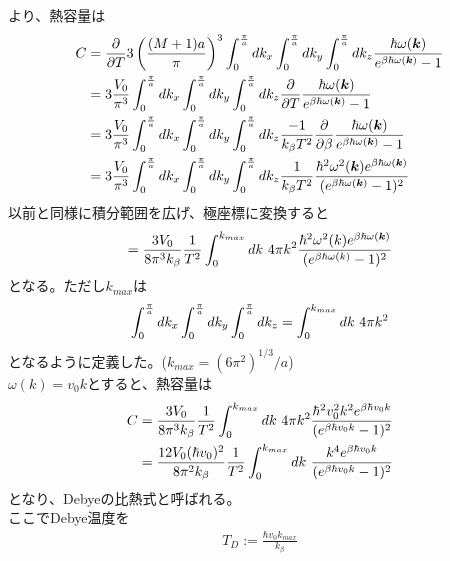 \documentclass[dvipdfmx, 11pt, a4paper]{jsarticle}
\theoremstyle{definition}
\begin{document}
    より、熱容量は
    \begin{align}
        C &= \frac{\partial}{\partial T} 3\left( \frac{(M+1)a}{\pi} \right)^3 \int_0^{\frac{\pi}{a}} dk_x \int_0^{\frac{\pi}{a}} dk_y \int_0^{\frac{\pi}{a}} dk_z \frac{\hbar \omega (\bm{k})}{ e^{\beta \hbar \omega (\bm{k})} - 1} \notag \\
        &= 3\frac{V_0}{\pi^3} \int_0^{\frac{\pi}{a}} dk_x \int_0^{\frac{\pi}{a}} dk_y \int_0^{\frac{\pi}{a}} dk_z  \frac{\partial}{\partial T} \frac{\hbar \omega (\bm{k})}{ e^{\beta \hbar \omega (\bm{k})} - 1} \notag \\
        &= 3\frac{V_0}{\pi^3} \int_0^{\frac{\pi}{a}} dk_x \int_0^{\frac{\pi}{a}} dk_y \int_0^{\frac{\pi}{a}} dk_z \frac{-1}{k_\beta T^2} \frac{\partial}{\partial \beta} \frac{\hbar \omega (\bm{k})}{ e^{\beta \hbar \omega (\bm{k})} - 1} \notag \\
        &= 3\frac{V_0}{\pi^3} \int_0^{\frac{\pi}{a}} dk_x \int_0^{\frac{\pi}{a}} dk_y \int_0^{\frac{\pi}{a}} dk_z \frac{1}{k_\beta T^2} \frac{\hbar^2 \omega^2 (\bm{k}) e^{\beta \hbar \omega (\bm{k})}}{ (e^{\beta \hbar \omega (\bm{k})} - 1)^2} \notag 
    \end{align}
    以前と同様に積分範囲を広げ、極座標に変換すると
    \begin{align}
        = \frac{3V_0}{8\pi^3 k_\beta} \frac{1}{T^2} \int_0^{k_{max}} dk\ 4\pi k^2 \frac{\hbar^2 \omega^2 (k)e^{\beta \hbar \omega (\bm{k})}}{ (e^{\beta \hbar \omega (k)} - 1)^2} \notag 
    \end{align}
    となる。ただし$k_{max}$は
    \begin{align}
         \int_0^{\frac{\pi}{a}} dk_x \int_0^{\frac{\pi}{a}} dk_y \int_0^{\frac{\pi}{a}} dk_z = \int_0^{k_{max}} dk\ 4\pi k^2 \notag 
    \end{align}
    となるように定義した。($k_{max} = (6\pi^2)^{1/3} / a$)\\
    $\omega (k) = v_0 k$とすると、熱容量は
    \begin{align}
        C &= \frac{3V_0}{8\pi^3 k_\beta} \frac{1}{T^2} \int_0^{k_{max}} dk\ 4\pi k^2 \frac{\hbar^2 v_0^2 k^2 e^{\beta \hbar v_0 k}}{ (e^{\beta \hbar v_0 k} - 1)^2} \notag \\
        &= \frac{12V_0(\hbar v_0 )^2}{8\pi^2 k_\beta} \frac{1}{T^2} \int_0^{k_{max}} dk\ \frac{k^4 e^{\beta \hbar v_0 k}}{(e^{\beta \hbar v_0 k} - 1)^2} 
    \end{align}
    となり、Debyeの比熱式と呼ばれる。\\
    ここでDebye温度を
    \begin{align}
        T_D := \frac{\hbar v_0 k_{max}}{k_\beta}
    \end{align}
\end{document}
